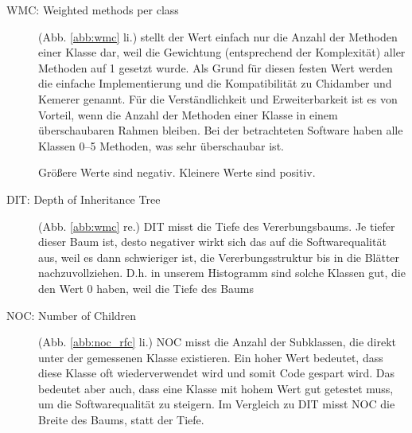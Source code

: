 \documentclass{scrreprt}
\begin{document}
\begin{description}


\item [WMC: Weighted methods per class] (Abb. \ref{abb:wmc} li.) stellt der Wert einfach nur die Anzahl der Methoden einer Klasse dar, weil die Gewichtung (entsprechend der Komplexität) aller Methoden auf 1 gesetzt wurde. Als Grund für diesen festen Wert werden die einfache Implementierung und die Kompatibilität zu Chidamber und Kemerer genannt. Für die Verständlichkeit und Erweiterbarkeit ist es von Vorteil, wenn die Anzahl der Methoden einer Klasse in einem überschaubaren Rahmen bleiben. Bei der betrachteten Software haben alle Klassen 0–5 Methoden, was sehr überschaubar ist.  

Größere Werte sind negativ. Kleinere Werte sind positiv.

    
    


\item [DIT: Depth of Inheritance Tree] (Abb. \ref{abb:wmc} re.)
 DIT misst die Tiefe des Vererbungsbaums. Je tiefer dieser Baum ist, desto negativer wirkt sich das auf die Softwarequalität aus, weil es dann schwieriger ist, die Vererbungsstruktur bis in die Blätter nachzuvollziehen. D.h. in unserem Histogramm sind solche Klassen gut, die den Wert 0 haben, weil die Tiefe des Baums


    
    
    
\item [NOC: Number of Children] (Abb. \ref{abb:noc_rfc} li.)
    NOC misst die Anzahl der Subklassen, die direkt unter der gemessenen Klasse existieren. Ein hoher Wert bedeutet, dass diese Klasse oft wiederverwendet wird und somit Code gespart wird. Das bedeutet aber auch, dass eine Klasse mit hohem Wert gut getestet muss, um die Softwarequalität zu steigern. Im Vergleich zu DIT misst NOC die Breite des Baums, statt der Tiefe.



\end{description}
\end{document}
